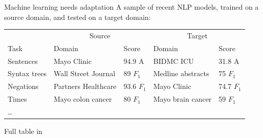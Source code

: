 \documentclass[14pt]{beamer}
\begin{document}
\begin{frame}{Machine learning needs adaptation}
A sample of recent NLP models, trained on a source domain, and tested on a target domain:

\bigskip
\footnotesize
\begin{tabular}{ l l l l l }
\toprule
& \multicolumn{2}{c}{Source} & \multicolumn{2}{c}{Target} \\
\cmidrule(lr){2-3}\cmidrule(lr){4-5}
Task & Domain & Score & Domain & Score \\
\midrule
Sentences & Mayo Clinic & 94.9 A & BIDMC ICU & 31.8 A \\
Syntax trees & Wall Street Journal & 89 $F_1$ & Medline abstracts & 75 $F_1$ \\
Negations & Partners Healthcare & 93.6 $F_1$ & Mayo Clinic & 74.7 $F_1$ \\
Times & Mayo colon cancer & 80 $F_1$ & Mayo brain cancer & 59 $F_1$ \\
\ldots \\
\bottomrule
\end{tabular}

\centering
\smallskip
Full table in \cite{laparra:JAMIAOpen:2020}
\end{frame}
\end{document}
